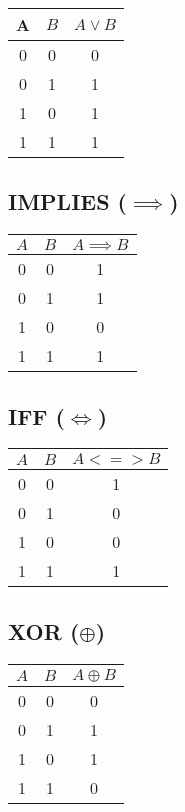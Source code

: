 \begin{multicols}{2}
	\begin{tabular}{ccc}
		\toprule
		\(\)A\(\) & \(B\) & \(A \lor B\) \\
		\midrule
		0   & 0   & 0          \\
		0   & 1   & 1          \\
		1   & 0   & 1          \\
		1   & 1   & 1          \\
		\bottomrule
	\end{tabular}

	\vspace{1em}

	\subsection*{IMPLIES (\(\implies\))}

	\begin{tabular}{ccc}
		\toprule
		\(A\) & \(B\) & \(A \implies B\) \\
		\midrule
		0   & 0   & 1        \\
		0   & 1   & 1        \\
		1   & 0   & 0        \\
		1   & 1   & 1        \\
		\bottomrule
	\end{tabular}

	\columnbreak

	\subsection*{IFF (\(\iff\))}

	\begin{tabular}{ccc}
		\toprule
		\(A\) & \(B\) & \(A <=> B\) \\
		\midrule
		0   & 0   & 1         \\
		0   & 1   & 0         \\
		1   & 0   & 0         \\
		1   & 1   & 1         \\
		\bottomrule
	\end{tabular}

	\vspace{1em}

	\subsection*{XOR (\(\oplus\))}

	\begin{tabular}{ccc}
		\toprule
		\(A\) & $B$ & $A \oplus B$ \\
		\midrule
		0   & 0   & 0            \\
		0   & 1   & 1            \\
		1   & 0   & 1            \\
		1   & 1   & 0            \\
		\bottomrule
	\end{tabular}


\end{multicols}
